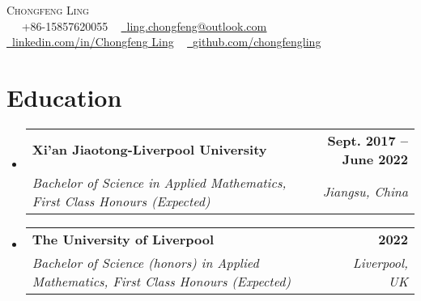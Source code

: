 \documentclass[letterpaper,11pt]{article}
\makeatletter
\newcommand{\resumeSubheading}[4]{
  \vspace{-2pt}\item
    \begin{tabular*}{1.0\textwidth}[t]{l@{\extracolsep{\fill}}r}
      \textbf{#1} & \textbf{\small #2} \\
      \textit{\small#3} & \textit{\small #4} \\
    \end{tabular*}\vspace{-7pt}
}
\newcommand{\resumeSubHeadingListStart}{\begin{itemize}[leftmargin=0.0in, label={}]}
\newcommand{\resumeSubHeadingListEnd}{\end{itemize}}
\makeatother
\begin{document}

\begin{center}
    {\Huge \scshape Chongfeng Ling} \\ \vspace{1pt} ~
    \small \raisebox{-0.1\height}\faPhone\ +86-15857620055 ~ \href{mailto:ling.chongfeng@outlook.com}{\raisebox{-0.2\height}\faEnvelope\  \underline{ling.chongfeng@outlook.com}} ~ 
    \href{https://www.linkedin.com/in/chongfeng-ling-6129561a7/}{\raisebox{-0.2\height}\faLinkedin\ \underline{linkedin.com/in/Chongfeng Ling}}  ~
    \href{https://github.com/chongfengling}{\raisebox{-0.2\height}\faGithub\ \underline{github.com/chongfengling}}
    \vspace{-8pt}
\end{center}


\section{Education}
  \resumeSubHeadingListStart
    \resumeSubheading
      {Xi'an Jiaotong-Liverpool University}{Sept. 2017 -- June 2022}
      {Bachelor of Science in Applied Mathematics, First Class Honours (Expected)}{Jiangsu, China}

    \resumeSubheading
      {The University of Liverpool}{2022}
      {Bachelor of Science (honors) in Applied Mathematics, First Class Honours (Expected)}{Liverpool, UK}
  \resumeSubHeadingListEnd

\end{document}
